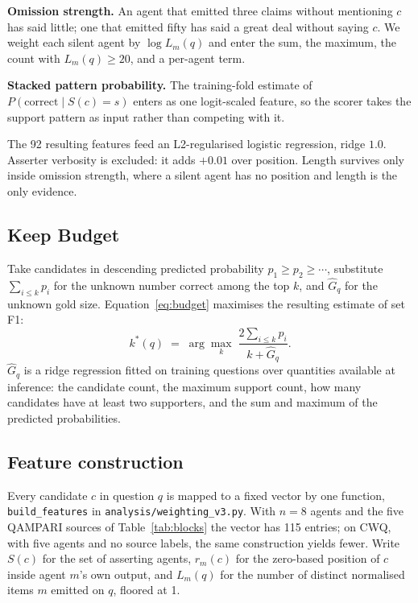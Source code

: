 \documentclass{article}
\begin{document}
\textbf{Omission strength.} An agent that emitted three claims without mentioning $c$ has
said little; one that emitted fifty has said a great deal without saying $c$. We weight
each silent agent by $\log L_m(q)$ and enter the sum, the maximum, the count with
$L_m(q) \geq 20$, and a per-agent term.

\textbf{Stacked pattern probability.} The training-fold estimate of
$P(\mathrm{correct} \mid S(c) = s)$ enters as one logit-scaled feature, so the scorer
takes the support pattern as input rather than competing with it.

The 92 resulting features feed an L2-regularised logistic regression, ridge $1.0$.
Asserter verbosity is excluded: it adds $+0.01$ over position. Length survives only
inside omission strength, where a silent agent has no position and length is the only
evidence.

\subsection{Keep Budget}

Take candidates in descending predicted probability $p_1 \geq p_2 \geq \cdots$,
substitute $\sum_{i \leq k} p_i$ for the unknown number correct among the top $k$, and
$\hat{G}_q$ for the unknown gold size. Equation~\ref{eq:budget} maximises the resulting
estimate of set F1:
\begin{equation}
\label{eq:budget}
  k^*(q) \;=\; \arg\max_k \; \frac{2 \sum_{i \leq k} p_i}{k + \hat{G}_q}.
\end{equation}
$\hat{G}_q$ is a ridge regression fitted on training questions over quantities available
at inference: the candidate count, the maximum support count, how many candidates have
at least two supporters, and the sum and maximum of the predicted probabilities.

\subsection{Feature construction}

Every candidate $c$ in question $q$ is mapped to a fixed vector by one function, \texttt{build\_features} in \texttt{analysis/weighting\_v3.py}. With $n=8$ agents and the five QAMPARI sources of Table~\ref{tab:blocks} the vector has 115 entries; on CWQ, with five agents and no source labels, the same construction yields fewer. Write $S(c)$ for the set of asserting agents, $r_m(c)$ for the zero-based position of $c$ inside agent $m$'s own output, and $L_m(q)$ for the number of distinct normalised items $m$ emitted on $q$, floored at 1.
\end{document}
